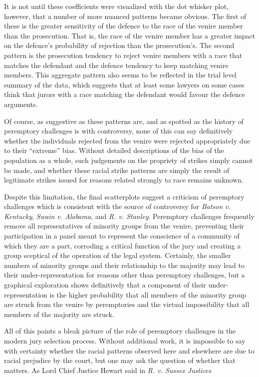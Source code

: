 It is not until these coefficients were visualized with the dot whisker plot, however, that a number of more nuanced patterns
became obvious. The first of these is the greater sensitivity of the defence to the race of the venire member than the
prosecution. That is, the race of the venire member has a greater impact on the defence's probability of rejection than the
prosecution's. The second pattern is the prosecution tendency to reject venire members with a race that matches the defendant and
the defence tendency to keep matching venire members. This aggregate pattern also seems to be reflected in the trial level
summary of the data, which suggests that at least some lawyers on some cases think that jurors with a race matching the defendant
would favour the defence arguments.

Of course, as suggestive as these patterns are, and as spotted as the history of peremptory challenges is with controversy, none
of this can say definitively whether the individuals rejected from the venire were rejected appropriately due to their ``extreme''
bias. Without detailed descriptions of the bias of the population as a whole, such judgements on the propriety of strikes simply
cannot be made, and whether these racial strike patterns are simply the result of legitimate strikes issued for reasons related
strongly to race remains unknown.

Despite this limitation, the final scatterplots suggest a criticism of peremptory challenges which is consistent with the source
of controversy for \textit{Batson v. Kentucky}, \textit{Swain v. Alabama}, and \textit{R. v. Stanley}. Peremptory challenges
frequently remove all representatives of minority groups from the venire, preventing their participation in a panel meant to
represent the conscience of a community of which they are a part, corroding a critical function of the jury and creating a group
sceptical of the operation of the legal system. Certainly, the smaller numbers of minority groups and their relationship to the
majority may lead to their under-representation for reasons other than peremptory challenges, but a graphical exploration shows
definitively that a component of their under-representation is the higher probability that all members of the minority group are
struck from the venire by peremptories and the virtual impossibility that all members of the majority are struck.

All of this paints a bleak picture of the role of peremptory challenges in the modern jury selection process. Without additional
work, it is impossible to say with certainty whether the racial patterns observed here and elsewhere are due to racial prejudice
by the court, but one may ask the question of whether that matters. As Lord Chief Justice Hewart said in \textit{R. v. Sussex
  Justices}

